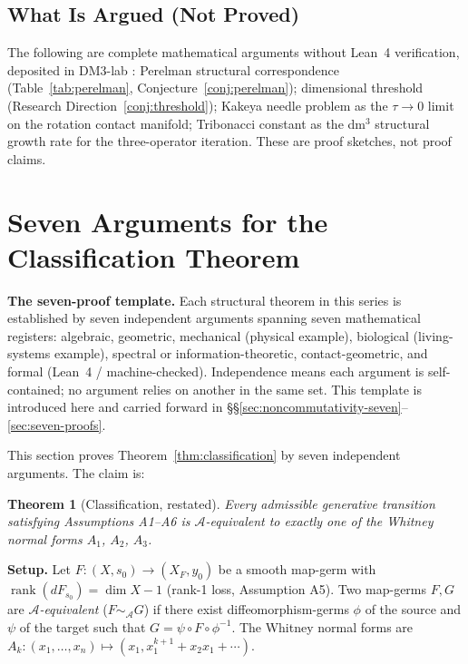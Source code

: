 \documentclass[14pt,a4paper]{extarticle}
\newtheorem{theorem}{Theorem}[section]
\begin{document}
\subsection{What Is Argued (Not Proved)}

The following are complete mathematical arguments without Lean~4
verification, deposited in DM3-lab \cite{DM3lab2026}:
Perelman structural correspondence
(Table~\ref{tab:perelman}, Conjecture~\ref{conj:perelman});
dimensional threshold
(Research Direction~\ref{conj:threshold});
Kakeya needle problem as the $\tau \to 0$ limit on the rotation
contact manifold;
Tribonacci constant as the dm$^3$ structural growth rate for the
three-operator iteration.
These are proof sketches, not proof claims.



\section{Seven Arguments for the Classification Theorem}
\label{sec:classification-seven}

\noindent\textbf{The seven-proof template.}
Each structural theorem in this series is established by seven independent
arguments spanning seven mathematical registers: algebraic, geometric,
mechanical (physical example), biological (living-systems example),
spectral or information-theoretic, contact-geometric, and formal
(Lean~4 / machine-checked).
Independence means each argument is self-contained; no argument relies on
another in the same set.
This template is introduced here and carried forward in
\S\S\ref{sec:noncommutativity-seven}--\ref{sec:seven-proofs}.


This section proves Theorem~\ref{thm:classification} by seven independent
arguments.  The claim is:

\begin{theorem}[Classification, restated]
\label{thm:classification-full}
Every admissible generative transition satisfying Assumptions A1--A6
is $\mathcal{A}$-equivalent to exactly one of the Whitney normal forms
$A_1$, $A_2$, $A_3$.
\end{theorem}

\noindent\textbf{Setup.}
Let $F: (X, s_0) \to (X_F, y_0)$ be a smooth map-germ with
$\operatorname{rank}(dF_{s_0}) = \dim X - 1$ (rank-1 loss, Assumption A5).
Two map-germs $F, G$ are \emph{$\mathcal{A}$-equivalent}
($F \sim_{\mathcal{A}} G$) if there exist diffeomorphism-germs
$\phi$ of the source and $\psi$ of the target such that $G = \psi \circ F \circ \phi^{-1}$.
The Whitney normal forms are $A_k: (x_1,\ldots,x_n) \mapsto (x_1,x_1^{k+1} + x_2 x_1 + \cdots)$.
\end{document}
